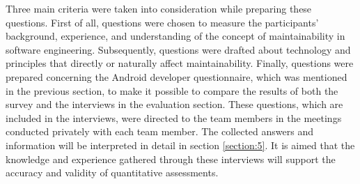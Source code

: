 Three main criteria were taken into consideration while preparing these questions. First of all, questions were chosen to measure the participants' background, experience, and understanding of the concept of maintainability in software engineering. Subsequently, questions were drafted about technology and principles that directly or naturally affect maintainability. Finally, questions were prepared concerning the Android developer questionnaire, which was mentioned in the previous section, to make it possible to compare the results of both the survey and the interviews in the evaluation section. These questions, which are included in the interviews, were directed to the team members in the meetings conducted privately with each team member. The collected answers and information will be interpreted in detail in section \ref{section:5}. It is aimed that the knowledge and experience gathered through these interviews will support the accuracy and validity of quantitative assessments.